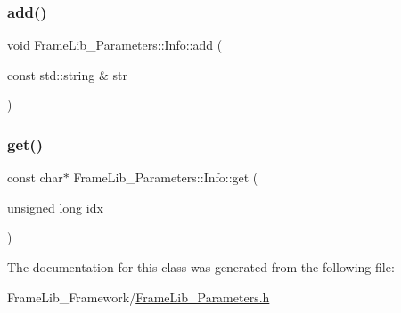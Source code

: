 \mbox{\label{class_frame_lib___parameters_1_1_info_ae5b7b0ee9401ba93b5a15cc25f0f7863}} 
\subsubsection{\texorpdfstring{add()}{add()}\hspace{0.1cm}{\footnotesize\ttfamily [2/2]}}
{\footnotesize\ttfamily void Frame\+Lib\+\_\+\+Parameters\+::\+Info\+::add (\begin{DoxyParamCaption}\item[{const std\+::string \&}]{str }\end{DoxyParamCaption})\hspace{0.3cm}{\ttfamily [inline]}}

\mbox{\label{class_frame_lib___parameters_1_1_info_a1f1518215e8de95d2e587de919ff47f0}} 
\subsubsection{\texorpdfstring{get()}{get()}}
{\footnotesize\ttfamily const char$\ast$ Frame\+Lib\+\_\+\+Parameters\+::\+Info\+::get (\begin{DoxyParamCaption}\item[{unsigned long}]{idx }\end{DoxyParamCaption})\hspace{0.3cm}{\ttfamily [inline]}}



The documentation for this class was generated from the following file\+:\begin{DoxyCompactItemize}
\item 
Frame\+Lib\+\_\+\+Framework/\hyperlink{_frame_lib___parameters_8h}{Frame\+Lib\+\_\+\+Parameters.\+h}\end{DoxyCompactItemize}
